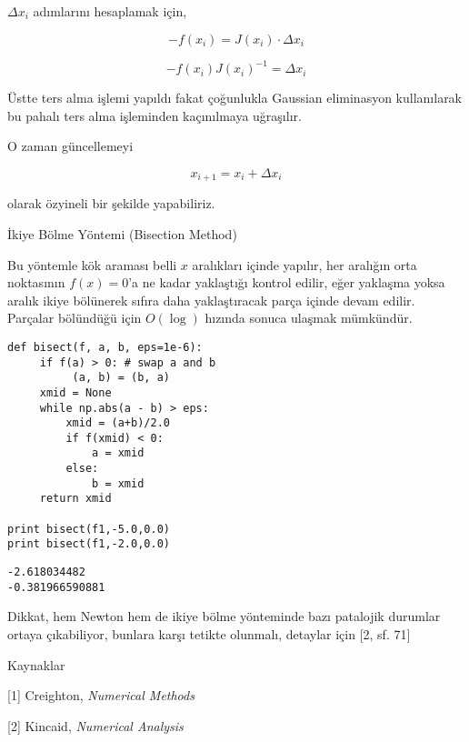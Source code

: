 \documentclass[12pt,fleqn]{article}\usepackage{../../common}
\begin{document}
$\Delta x_i$ adımlarını hesaplamak için,

$$  -f(x_i) =  J(x_i) \cdot \Delta x_i  $$

$$  -f(x_i)J(x_i)^{-1} = \Delta x_i  $$

Üstte ters alma işlemi yapıldı fakat çoğunlukla Gaussian eliminasyon
kullanılarak bu pahalı ters alma işleminden kaçınılmaya uğraşılır.

O zaman güncellemeyi

$$ x_{i+1} = x_i + \Delta x_i $$

olarak özyineli bir şekilde yapabiliriz.

İkiye Bölme Yöntemi (Bisection Method)

Bu yöntemle kök araması belli $x$ aralıkları içinde yapılır, her aralığın
orta noktasının $f(x)=0$'a ne kadar yaklaştığı kontrol edilir, eğer
yaklaşma yoksa aralık ikiye bölünerek sıfıra daha yaklaştıracak parça
içinde devam edilir. Parçalar bölündüğü için $O(\log)$ hızında sonuca
ulaşmak mümkündür.

\begin{verbatim}
def bisect(f, a, b, eps=1e-6):
     if f(a) > 0: # swap a and b
          (a, b) = (b, a)
     xmid = None
     while np.abs(a - b) > eps:
         xmid = (a+b)/2.0
         if f(xmid) < 0:
             a = xmid
         else:
             b = xmid
     return xmid

print bisect(f1,-5.0,0.0) 
print bisect(f1,-2.0,0.0) 
\end{verbatim}

\begin{verbatim}
-2.618034482
-0.381966590881
\end{verbatim}

Dikkat, hem Newton hem de ikiye bölme yönteminde bazı patalojik durumlar
ortaya çıkabiliyor, bunlara karşı tetikte olunmalı, detaylar için [2, sf. 71]

Kaynaklar 

[1] Creighton, {\em Numerical Methods}

[2] Kincaid, {\em Numerical Analysis}
\end{document}
